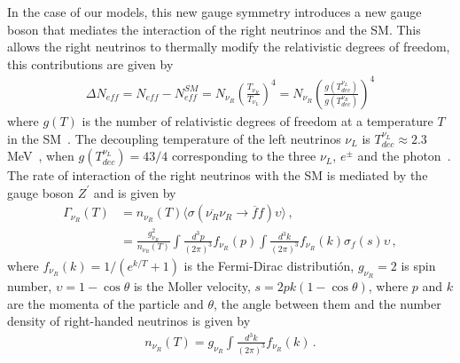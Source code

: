 \documentclass[12pt]{article}
\begin{document}
In the case of our models, this new gauge symmetry introduces a new gauge boson that mediates the interaction of the right neutrinos and the SM. This allows the right neutrinos to thermally modify the relativistic degrees of freedom, this contributions are given by~\cite{Anchordoqui:2012qu, Anchordoqui:2011nh}
%
\begin{align*}
    \Delta N_{eff} = N_{eff} - N^{SM}_{eff} = N_{\nu_R} \left( \frac{T_{\nu_{R}}}{T_{\nu_{L}}} \right)^{4} = N_{\nu_R} \left( \frac{g(T^{\nu_{L}}_{dec})}{g(T^{\nu_{R}}_{dec})} \right)^{4}
\end{align*}
%
where $ g(T) $ is the number of relativistic degrees of freedom at a temperature $T$ in the SM~\cite{Aghanim:2018eyx}. The decoupling temperature of the left neutrinos $\nu_L$ is $ T^{\nu_{L}}_{dec} \approx 2.3 $ MeV~\cite{Enqvist:1991gx}, when $g(T^{\nu_{L}}_{ dec}) = 43/4 $ corresponding to the three $\nu_{L}$, $e^{\pm} $ and the photon~\cite{Kolb:1990vq}. The rate of interaction of the right neutrinos with the SM is mediated by the gauge boson $Z^{\prime} $ and is given by~\cite{SolagurenBeascoa:2012cz}
%
\begin{align*}
    \Gamma_{\nu_R} (T) &= n_{\nu_R}(T) \langle \sigma(\overline{\nu_{R}} \nu_{R} \to \overline{f} f) \upsilon \rangle \,, \\
    &= \frac{g^{2}_{\nu_R}}{n_{\nu_R}(T)} \int \frac{d^{3} p}{(2 \pi)^{3}} f_{\nu_R}(p) \int \frac{d^{3} k}{(2 \pi)^{3}} f_{\nu_R}(k) \sigma_{f}(s) \upsilon\,,
\end{align*}
%
where $f_{\nu_R}(k)=1/(e^{k/T}+1)$ is the Fermi-Dirac distributión, $g_{\nu_R} = 2$ is spin number, $\upsilon = 1-\cos{\theta}$ is the Moller velocity, $s = 2 p k (1-\cos{\theta})$, where $p$ and $k$ are the momenta of the particle and $\theta$, the angle between them and the number density of right-handed neutrinos is given by
\begin{align*}
n_{\nu_R}(T) = g_{\nu_R} \int \frac{d^{3} k}{(2 \pi)^{3}} f_{\nu_R}(k)\,.
\end{align*}
\end{document}
